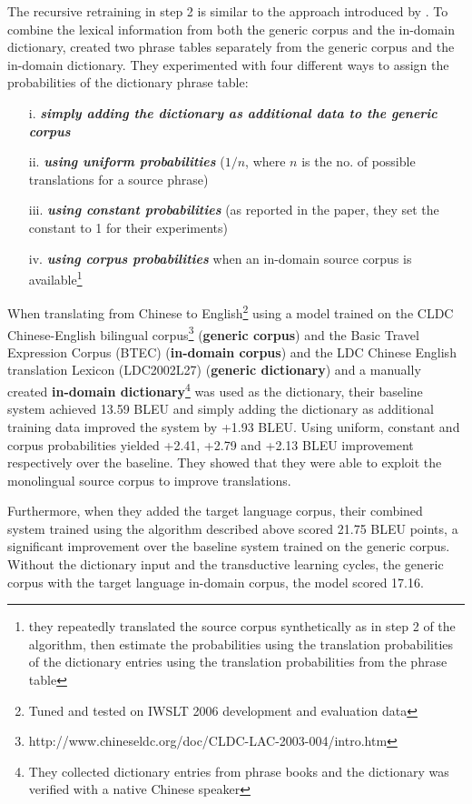 The recursive retraining in step 2 is similar to the   approach introduced by \cite{ueffing2007transductive}. To combine the lexical information from both the generic corpus and the in-domain dictionary, \cite{wu2008domain} created two phrase tables separately from the generic corpus and the in-domain dictionary. They experimented with four different ways to assign the probabilities of the dictionary phrase table: 

\begin{itemize}
\item[i.] \emph{\textbf{simply adding the dictionary as additional data to the generic corpus}}
\item[ii.] \emph{\textbf{using uniform probabilities}} ($1/n$, where $n$ is the no. of possible translations for a source phrase) 
\item[iii.] \emph{\textbf{using constant probabilities}} (as reported in the paper, they set the constant to 1 for their experiments)
\item[iv.] \emph{\textbf{using corpus probabilities}} when an in-domain source corpus is available\footnote{they repeatedly translated the source corpus synthetically as in step 2 of the algorithm, then estimate the probabilities using the translation probabilities of the dictionary entries using the translation probabilities from the phrase table}
\end{itemize}

When translating from Chinese to English\footnote{Tuned and tested on IWSLT 2006 development and evaluation data} using a model trained on the CLDC Chinese-English bilingual corpus\footnote{http://www.chineseldc.org/doc/CLDC-LAC-2003-004/intro.htm} (\textbf{generic corpus}) and the Basic Travel Expression Corpus (BTEC) \citep{iwslt2006} (\textbf{in-domain corpus}) and the LDC Chinese English translation Lexicon (LDC2002L27) (\textbf{generic dictionary}) and a manually created \textbf{in-domain dictionary}\footnote{They collected dictionary entries from phrase books and the dictionary was verified with a native Chinese speaker} was used as the dictionary, their baseline system achieved 13.59 BLEU and simply adding the dictionary as additional training data improved the system by +1.93 BLEU. Using uniform, constant and corpus probabilities yielded +2.41, +2.79 and +2.13 BLEU improvement respectively over the baseline. They showed that they were able to exploit the monolingual source corpus to improve translations. 

Furthermore, when they added the target language corpus, their combined system trained using the algorithm described above scored 21.75 BLEU points, a significant improvement over the baseline system trained on the generic corpus. Without the dictionary input and the transductive learning cycles, the generic corpus with the target language in-domain corpus, the model scored 17.16. 

